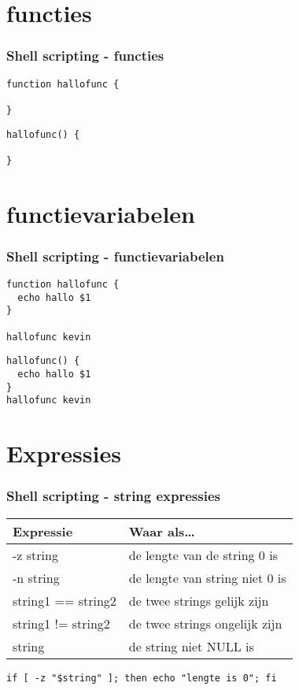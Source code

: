 \documentclass{beamer}
\begin{document}
\section{functies}

\begin{frame}[fragile]
  \frametitle{Shell scripting - functies}
  \begin{lstlisting}
function hallofunc {

}
  \end{lstlisting}
  \begin{lstlisting}
hallofunc() {

}
  \end{lstlisting}
\end{frame}

\section{functievariabelen}

\begin{frame}[fragile]
  \frametitle{Shell scripting - functievariabelen}
  \begin{lstlisting}
function hallofunc {
  echo hallo $1
}

hallofunc kevin
  \end{lstlisting}
  \begin{lstlisting}
hallofunc() {
  echo hallo $1
}
hallofunc kevin
  \end{lstlisting}
\end{frame}

\section{Expressies}

\begin{frame}[fragile]
  \frametitle{Shell scripting - string expressies}
  \begin{tabular}[t]{ll}
    Expressie & Waar als\ldots \\
    \hline
    -z string & de lengte van de string 0 is \\
    -n string & de lengte van string niet 0 is\\
    string1 == string2 & de twee strings gelijk zijn\\
    string1 != string2 & de twee strings ongelijk zijn\\
    string & de string niet NULL is\\
  \end{tabular}
  \begin{lstlisting}
if [ -z "$string" ]; then echo "lengte is 0"; fi
  \end{lstlisting}%
\end{frame}
\end{document}
